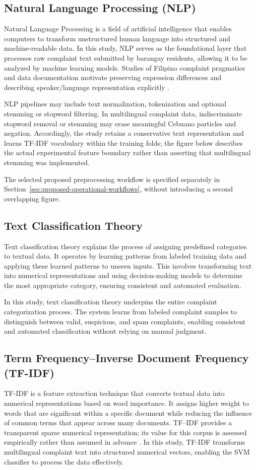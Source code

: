 \subsection{Natural Language Processing (NLP)}
Natural Language Processing is a field of artificial intelligence that enables computers to transform unstructured human language into structured and machine-readable data. In this study, NLP serves as the foundational layer that processes raw complaint text submitted by barangay residents, allowing it to be analyzed by machine learning models. Studies of Filipino complaint pragmatics and data documentation motivate preserving expression differences and describing speaker/language representation explicitly \cite{deleon,benderfriedman}.

NLP pipelines may include text normalization, tokenization and optional stemming or stopword filtering. In multilingual complaint data, indiscriminate stopword removal or stemming may erase meaningful Cebuano particles and negation. Accordingly, the study retains a conservative text representation and learns TF-IDF vocabulary within the training folds; the figure below describes the actual experimental feature boundary rather than asserting that multilingual stemming was implemented.

The selected proposed preprocessing workflow is specified separately in Section~\ref{sec:proposed-operational-workflows}, without introducing a second overlapping figure.

\subsection{Text Classification Theory}
Text classification theory explains the process of assigning predefined categories to textual data. It operates by learning patterns from labeled training data and applying these learned patterns to unseen inputs. This involves transforming text into numerical representations and using decision-making models to determine the most appropriate category, ensuring consistent and automated evaluation.

In this study, text classification theory underpins the entire complaint categorization process. The system learns from labeled complaint samples to distinguish between valid, suspicious, and spam complaints, enabling consistent and automated classification without relying on manual judgment.

\subsection{Term Frequency--Inverse Document Frequency (TF-IDF)}
TF-IDF is a feature extraction technique that converts textual data into numerical representations based on word importance. It assigns higher weight to words that are significant within a specific document while reducing the influence of common terms that appear across many documents. TF--IDF provides a transparent sparse numerical representation; its value for this corpus is assessed empirically rather than assumed in advance \cite{sklearntfidf}. In this study, TF-IDF transforms multilingual complaint text into structured numerical vectors, enabling the SVM classifier to process the data effectively.

